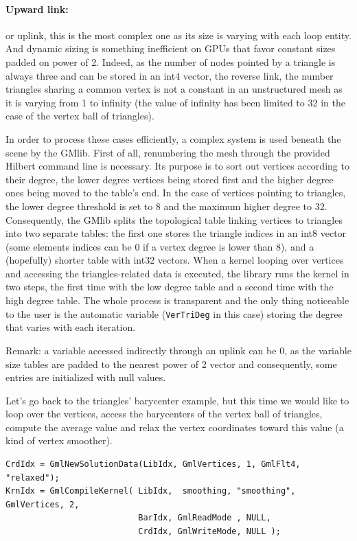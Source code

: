 \documentclass[a4paper,12pt]{article}
\begin{document}
\paragraph{Upward link:} or uplink, this is the most complex one as its size is varying with each loop entity. And dynamic sizing is something inefficient on GPUs that favor constant sizes padded on power of 2. Indeed, as the number of nodes pointed by a triangle is always three and can be stored in an int4 vector, the reverse link, the number triangles sharing a common vertex is not a constant in an unstructured mesh as it is varying from 1 to infinity (the value of infinity has been limited to 32 in the case of the vertex ball of triangles).

In order to process these cases efficiently, a complex system is used beneath the scene by the GMlib. First of all, renumbering the mesh through the provided Hilbert command line is necessary. Its purpose is to sort out vertices according to their degree, the lower degree vertices being stored first and the higher degree ones being moved to the table's end. In the case of vertices pointing to triangles, the lower degree threshold is set to 8 and the maximum higher degree to 32. Consequently, the GMlib splits the topological table linking vertices to triangles into two separate tables: the first one stores the triangle indices in an int8 vector (some elements indices can be $0$ if a vertex degree is lower than 8), and a (hopefully) shorter table with int32 vectors. When a kernel looping over vertices and accessing the triangles-related data is executed, the library runs the kernel in two steps, the first time with the low degree table and a second time with the high degree table. The whole process is transparent and the only thing noticeable to the user is the automatic variable ({\tt VerTriDeg} in this case) storing the degree that varies with each iteration.

Remark: a variable accessed indirectly through an uplink can be $0$, as the variable size tables are padded to the nearest power of 2 vector and consequently, some entries are initialized with null values.

Let's go back to the triangles' barycenter example, but this time we would like to loop over the vertices, access the barycenters of the vertex ball of triangles, compute the average value and relax the vertex coordinates toward this value (a kind of vertex smoother).

\begin{tt}
\begin{verbatim}
CrdIdx = GmlNewSolutionData(LibIdx, GmlVertices, 1, GmlFlt4, "relaxed");
KrnIdx = GmlCompileKernel( LibIdx,  smoothing, "smoothing", GmlVertices, 2,
                           BarIdx, GmlReadMode , NULL,
                           CrdIdx, GmlWriteMode, NULL );
\end{verbatim}
\end{tt}
\normalfont
\end{document}

